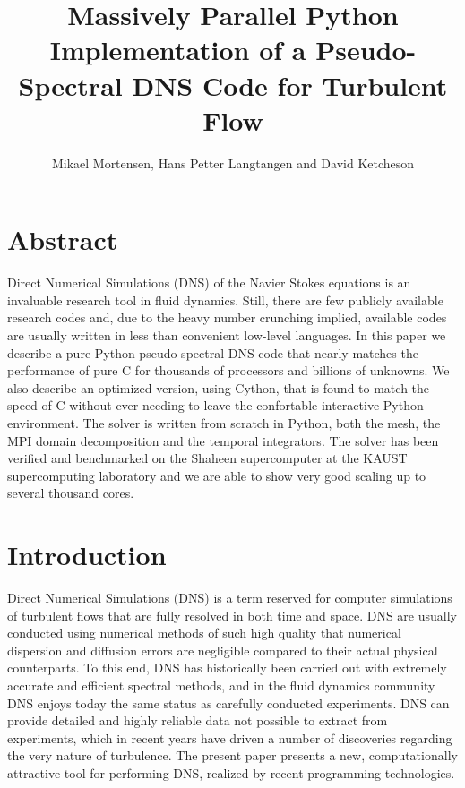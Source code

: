 \documentclass[11pt, oneside]{article}
\title{Massively Parallel Python Implementation of a Pseudo-Spectral DNS Code for Turbulent Flow}
\author{Mikael Mortensen, Hans Petter Langtangen and David Ketcheson}
\begin{document}
\maketitle
\section*{Abstract}
Direct Numerical Simulations (DNS) of the Navier Stokes equations is an 
invaluable research tool in fluid dynamics. Still, there are few publicly 
available research codes and, due to the heavy number crunching implied, 
available codes are usually written in less than convenient low-level 
languages. In this paper we describe a pure Python pseudo-spectral DNS code 
that nearly matches the performance of pure C for thousands of processors 
and billions of unknowns. We also describe an optimized version, using 
Cython, that is found to match the speed of C without ever needing to leave 
the confortable interactive Python environment. The solver is written from 
scratch in Python, both the mesh, the MPI domain decomposition and the 
temporal integrators. The solver has been verified and benchmarked on the Shaheen supercomputer at the 
KAUST supercomputing laboratory and we are able to show very good scaling up to several thousand cores. 

\section{Introduction}
Direct Numerical Simulations (DNS) is a term reserved for computer simulations of turbulent flows that are 
fully resolved in both time and space. DNS are usually conducted using numerical methods of such high 
quality that numerical dispersion and diffusion errors are negligible compared to their actual physical 
counterparts. To this end, DNS has historically been carried out with extremely accurate and efficient 
spectral methods, and in the fluid dynamics community DNS enjoys  today the same status as carefully 
conducted experiments. DNS can provide detailed and highly reliable data not possible to extract from 
experiments, which in recent years have driven a number of discoveries regarding the very nature of 
turbulence. The present paper presents a new, computationally attractive tool for performing DNS, realized 
by recent programming technologies.
\end{document}
